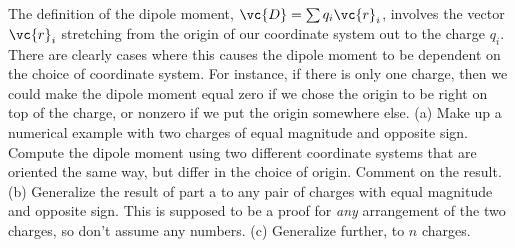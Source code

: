         The definition of the dipole moment, $\vc{D}=\sum q_i \vc{r}_i$,
        involves the vector $\vc{r}_i$ stretching from the origin of our coordinate
        system out to the charge $q_i$. There are clearly cases where this
        causes the dipole moment to be dependent on the choice of coordinate
        system. For instance, if there is only one charge, then we could make
        the dipole moment equal zero if we chose the origin to be right on top
        of the charge, or nonzero if we put the origin somewhere else.\hwendpart
        (a) Make up a numerical example with two charges of equal magnitude
        and opposite sign. Compute the dipole moment using two different coordinate
        systems that are oriented the same way, but differ in the choice of origin.
        Comment on the result.\hwendpart
        (b) Generalize the result of part a to any pair of charges with equal
        magnitude and opposite sign. This is supposed to be a proof for \emph{any}
        arrangement of the two charges, so don't assume any numbers.\hwendpart
        (c) Generalize further, to $n$ charges.
